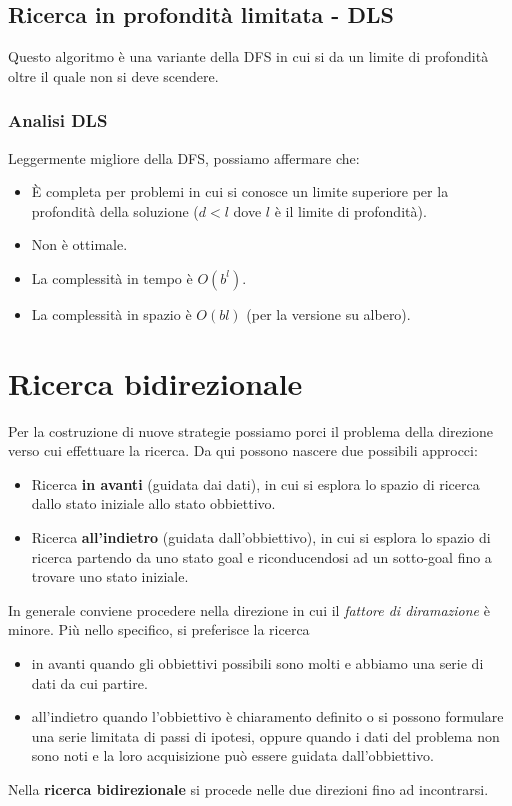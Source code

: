 \newpage
\subsection{Ricerca in profondit\`a limitata - DLS}
Questo algoritmo \`e una variante della DFS in cui si da un limite di profondit\`a oltre
il quale non si deve scendere.

\subsubsection{Analisi DLS}
Leggermente migliore della DFS, possiamo affermare che:
\begin{itemize}
	\item \`E completa per problemi in cui si conosce un limite superiore per la profondit\`a
	      della soluzione ($d < l$ dove $l$ \`e il limite di profondit\`a).
	\item Non \`e ottimale.
	\item La complessit\`a in tempo \`e $O(b^l)$.
	\item La complessit\`a in spazio \`e $O(bl)$ (per la versione su albero).
\end{itemize}

\section{Ricerca bidirezionale}
Per la costruzione di nuove strategie possiamo porci il problema della direzione verso cui
effettuare la ricerca.
Da qui possono nascere due possibili approcci:
\begin{itemize}
	\item Ricerca \textbf{in avanti} (guidata dai dati), in cui si esplora lo spazio di
	      ricerca dallo stato iniziale allo stato obbiettivo.
	\item Ricerca \textbf{all'indietro} (guidata dall'obbiettivo), in cui si esplora lo
	      spazio di ricerca partendo da uno stato goal e riconducendosi ad un sotto-goal
	      fino a trovare uno stato iniziale.
\end{itemize}
In generale conviene procedere nella direzione in cui il \emph{fattore di diramazione}
\`e minore.
Pi\`u nello specifico, si preferisce la ricerca
\begin{itemize}
	\item in avanti quando gli obbiettivi possibili sono molti e abbiamo una serie di dati
	      da cui partire.
	\item all'indietro quando l'obbiettivo \`e chiaramento definito o si possono formulare
	      una serie limitata di passi di ipotesi, oppure quando i dati del problema non
	      sono noti e la loro acquisizione pu\`o essere guidata dall'obbiettivo.
\end{itemize}
Nella \textbf{ricerca bidirezionale} si procede nelle due direzioni fino ad incontrarsi.

